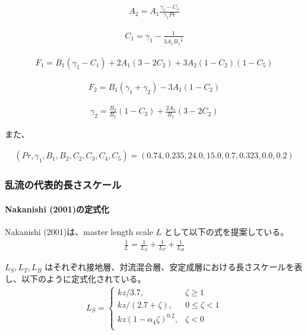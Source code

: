 \begin{eqnarray}A_2=A_1\frac{\gamma_1-C_1}{\gamma_1 Pr}\end{eqnarray}

\begin{eqnarray}C_1=\gamma_1-\frac{1}{3A_1{B_1}^{\frac{1}{3}}}\end{eqnarray}

\begin{eqnarray}F_1=B_1(\gamma_1-C_1)+2A_1(3-2C_2)+3A_2(1-C_2)(1-C_5)\end{eqnarray}

\begin{eqnarray}F_2=B_1(\gamma_1+\gamma_2)-3A_1(1-C_2)\end{eqnarray}

\begin{eqnarray}\gamma_2=\frac{B_2}{B_1}\left(1-C_3\right)+\frac{2A_1}{B_1}\left(3-2C_2\right)\end{eqnarray}

また、

\begin{eqnarray}
(Pr,\gamma_1,B_1,B_2,C_2,C_3,C_4,C_5)=(0.74,0.235,24.0,15.0,0.7,0.323,0.0,0.2)
\end{eqnarray}

\hypertarget{ux4e71ux6d41ux306eux4ee3ux8868ux7684ux9577ux3055ux30b9ux30b1ux30fcux30eb}{%
\subsubsection{乱流の代表的長さスケール}\label{ux4e71ux6d41ux306eux4ee3ux8868ux7684ux9577ux3055ux30b9ux30b1ux30fcux30eb}}

\hypertarget{nakanishi-2001ux306eux5b9aux5f0fux5316}{%
\paragraph{Nakanishi
(2001)の定式化}\label{nakanishi-2001ux306eux5b9aux5f0fux5316}}

Nakanishi (2001)は、master length scale \(L\)
として以下の式を提案している。
\begin{eqnarray}\frac{1}{L}=\frac{1}{L_S}+\frac{1}{L_T}+\frac{1}{L_B} \tag{1} \end{eqnarray}

\(L_S,L_T,L_B\)
はそれぞれ接地層、対流混合層、安定成層における長さスケールを表し、以下のように定式化されている。
\begin{eqnarray}
L_S=\left\{
    \begin{array}{lr}
      kz/3.7, &\zeta\ge 1\\
      kz/(2.7+\zeta), &0\le\zeta< 1\\
      kz(1-\alpha_4\zeta)^{0.2}, &\zeta< 0\\
    \end{array}
  \right.
\end{eqnarray}

